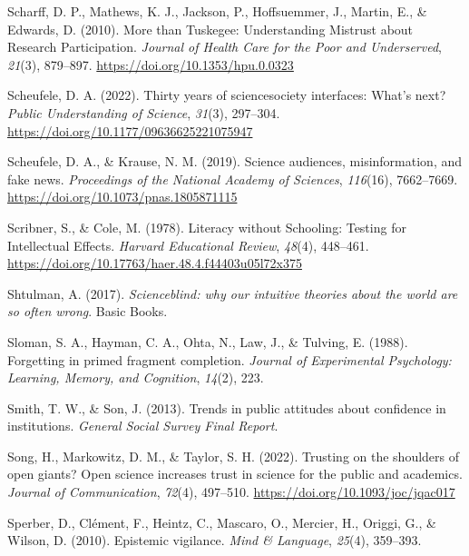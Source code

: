 \documentclass[
  jou,
  floatsintext,
  longtable,
  nolmodern,
  notxfonts,
  notimes,
  colorlinks=true,linkcolor=blue,citecolor=blue,urlcolor=blue]{apa7}
\newlength{\cslhangindent}
\newenvironment{CSLReferences}[2] %
 {\begin{list}{}{%
  \setlength{\itemindent}{0pt}
  \setlength{\leftmargin}{0pt}
  \setlength{\parsep}{0pt}
  \ifodd #1
   \setlength{\leftmargin}{\cslhangindent}
   \setlength{\itemindent}{-1\cslhangindent}
  \fi
  \setlength{\itemsep}{#2\baselineskip}}}
 {\end{list}}
\begin{document}
\begin{CSLReferences}{1}{0}
Scharff, D. P., Mathews, K. J., Jackson, P., Hoffsuemmer, J., Martin,
E., \& Edwards, D. (2010). More than Tuskegee: Understanding Mistrust
about Research Participation. \emph{Journal of Health Care for the Poor
and Underserved}, \emph{21}(3), 879--897.
\url{https://doi.org/10.1353/hpu.0.0323}

Scheufele, D. A. (2022). Thirty years of science{\textendash}society
interfaces: What{'}s next? \emph{Public Understanding of Science},
\emph{31}(3), 297--304. \url{https://doi.org/10.1177/09636625221075947}

Scheufele, D. A., \& Krause, N. M. (2019). Science audiences,
misinformation, and fake news. \emph{Proceedings of the National Academy
of Sciences}, \emph{116}(16), 7662--7669.
\url{https://doi.org/10.1073/pnas.1805871115}

Scribner, S., \& Cole, M. (1978). Literacy without Schooling: Testing
for Intellectual Effects. \emph{Harvard Educational Review},
\emph{48}(4), 448--461.
\url{https://doi.org/10.17763/haer.48.4.f44403u05l72x375}

Shtulman, A. (2017). \emph{Scienceblind: why our intuitive theories
about the world are so often wrong}. Basic Books.

Sloman, S. A., Hayman, C. A., Ohta, N., Law, J., \& Tulving, E. (1988).
Forgetting in primed fragment completion. \emph{Journal of Experimental
Psychology: Learning, Memory, and Cognition}, \emph{14}(2), 223.

Smith, T. W., \& Son, J. (2013). Trends in public attitudes about
confidence in institutions. \emph{General Social Survey Final Report}.

Song, H., Markowitz, D. M., \& Taylor, S. H. (2022). Trusting on the
shoulders of open giants? Open science increases trust in science for
the public and academics. \emph{Journal of Communication}, \emph{72}(4),
497--510. \url{https://doi.org/10.1093/joc/jqac017}

Sperber, D., Clément, F., Heintz, C., Mascaro, O., Mercier, H., Origgi,
G., \& Wilson, D. (2010). Epistemic vigilance. \emph{Mind \& Language},
\emph{25}(4), 359--393.


\end{CSLReferences}
\end{document}
